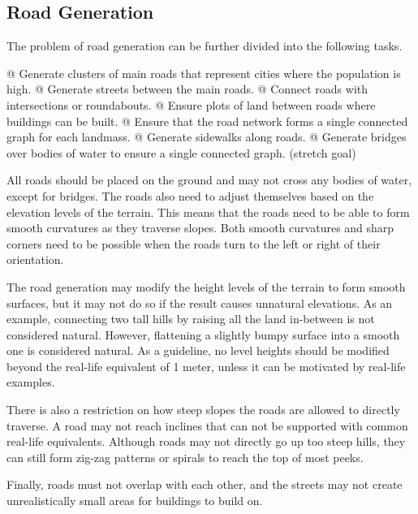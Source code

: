 \subsection{Road Generation}

The problem of road generation can be further divided into the following tasks.

\begin{easylist}
  @ Generate clusters of main roads that represent cities where the population is high.
  @ Generate streets between the main roads.
  @ Connect roads with intersections or roundabouts.
  @ Ensure plots of land between roads where buildings can be built.
  @ Ensure that the road network forms a single connected graph for each landmass.
  @ Generate sidewalks along roads.
  @ Generate bridges over bodies of water to ensure a single connected graph. (stretch goal)
\end{easylist}

All roads should be placed on the ground and may not cross any bodies of water, except for bridges.
The roads also need to adjust themselves based on the elevation levels of the terrain.
This means that the roads need to be able to form smooth curvatures as they traverse slopes.
Both smooth curvatures and sharp corners need to be possible when the roads turn to the left or right of their orientation.

The road generation may modify the height levels of the terrain to form smooth surfaces, but it may not do so if the result causes unnatural elevations.
As an example, connecting two tall hills by raising all the land in-between is not considered natural.
However, flattening a slightly bumpy surface into a smooth one is considered natural.
As a guideline, no level heights should be modified beyond the real-life equivalent of 1 meter, unless it can be motivated by real-life examples.

There is also a restriction on how steep slopes the roads are allowed to directly traverse.
A road may not reach inclines that can not be supported with common real-life equivalents.
Although roads may not directly go up too steep hills, they can still form zig-zag patterns or spirals to reach the top of most peeks.

Finally, roads must not overlap with each other, and the streets may not create unrealistically small areas for buildings to build on.